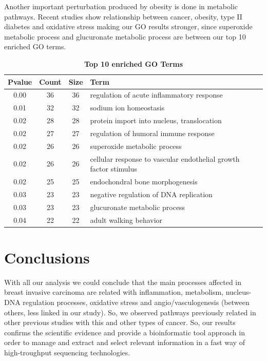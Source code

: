 \documentclass[9pt,twocolumn,twoside]{gsajnl}
\begin{document}
Another important perturbation produced by obesity is done in metabolic pathways. Recent studies show relationship between cancer, obesity, type II diabetes and oxidative stress \citep{Ferroni2015,Flanagan2015} making our GO results stronger, since superoxide metabolic process and glucuronate metabolic process are between our top 10 enriched GO terms.
\vspace{2mm}

 

\begin{table}[ht]
\centering
\caption{\bf Top 10 enriched GO Terms}
\begin{tableminipage}{\textwidth}
\begin{tabular}{cccp{3cm}}
  \hline
 Pvalue & Count & Size & Term\\ 
  \hline
0.00 &  36 &  36 & regulation of acute inflammatory response\\ 
0.01 &  32 &  32 & sodium ion homeostasis \\ 
0.02 &  28 &  28 & protein import into nucleus, translocation\\ 
0.02 &  27 &  27 & regulation of humoral immune response\\ 
0.02 &  26 &  26 & superoxide metabolic process \\ 
0.02&  26 &  26 & cellular response to vascular endothelial growth factor stimulus\\ 
0.02 &  25 &  25 & endochondral bone morphogenesis\\ 
0.03 &  23 &  23 & negative regulation of DNA replication\\ 
0.03 &  23 &  23 & glucuronate metabolic process\\ 
0.04 &  22 &  22 & adult walking behavior\\ 
   \hline
\end{tabular}
\end{tableminipage}
\label{table}
\end{table}

\section*{Conclusions}
With all our analysis we could conclude that the main processes affected in breast invasive carcinoma are related with inflammation, metabolism, nucleus-DNA regulation processes, oxidative stress and angio/vasculogenesis (between others, less linked in our study). So, we observed pathways previously related in other previous studies with this and other types of cancer. So, our results confirms the scientific evidence and provide a bioinformatic tool approach in order to manage and extract and select relevant information in a fast way of high-troughput sequencing technologies.
\vspace{2mm}
\end{document}
